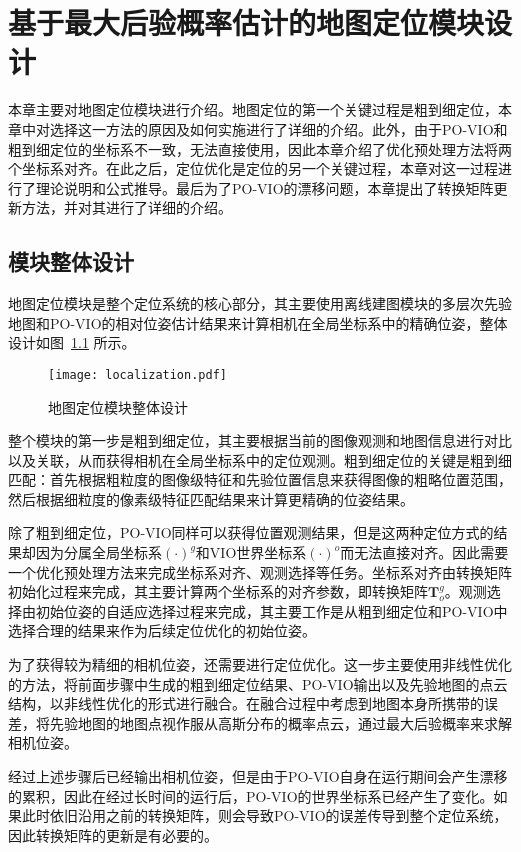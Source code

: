 
\chapter{基于最大后验概率估计的地图定位模块设计}

本章主要对地图定位模块进行介绍。地图定位的第一个关键过程是粗到细定位，本章中对选择这一方法的原因及如何实施进行了详细的介绍。此外，由于PO-VIO和粗到细定位的坐标系不一致，无法直接使用，因此本章介绍了优化预处理方法将两个坐标系对齐。在此之后，定位优化是定位的另一个关键过程，本章对这一过程进行了理论说明和公式推导。最后为了PO-VIO的漂移问题，本章提出了转换矩阵更新方法，并对其进行了详细的介绍。

\section{模块整体设计}

地图定位模块是整个定位系统的核心部分，其主要使用离线建图模块的多层次先验地图和PO-VIO的相对位姿估计结果来计算相机在全局坐标系中的精确位姿，整体设计如图~\ref{fig:localization} 所示。

\begin{figure}
  \centering
  \texttt{[image: localization.pdf]}
  \caption{地图定位模块整体设计}
  \label{fig:localization}
\end{figure}

整个模块的第一步是粗到细定位，其主要根据当前的图像观测和地图信息进行对比以及关联，从而获得相机在全局坐标系中的定位观测。粗到细定位的关键是粗到细匹配：首先根据粗粒度的图像级特征和先验位置信息来获得图像的粗略位置范围，然后根据细粒度的像素级特征匹配结果来计算更精确的位姿结果。

除了粗到细定位，PO-VIO同样可以获得位置观测结果，但是这两种定位方式的结果却因为分属全局坐标系$(\cdot)^{g}$和VIO世界坐标系$(\cdot)^{o}$而无法直接对齐。因此需要一个优化预处理方法来完成坐标系对齐、观测选择等任务。坐标系对齐由转换矩阵初始化过程来完成，其主要计算两个坐标系的对齐参数，即转换矩阵$\symbf{T}_o^{g}$。观测选择由初始位姿的自适应选择过程来完成，其主要工作是从粗到细定位和PO-VIO中选择合理的结果来作为后续定位优化的初始位姿。

为了获得较为精细的相机位姿，还需要进行定位优化。这一步主要使用非线性优化的方法，将前面步骤中生成的粗到细定位结果、PO-VIO输出以及先验地图的点云结构，以非线性优化的形式进行融合。在融合过程中考虑到地图本身所携带的误差，将先验地图的地图点视作服从高斯分布的概率点云，通过最大后验概率来求解相机位姿。

经过上述步骤后已经输出相机位姿，但是由于PO-VIO自身在运行期间会产生漂移的累积，因此在经过长时间的运行后，PO-VIO的世界坐标系已经产生了变化。如果此时依旧沿用之前的转换矩阵，则会导致PO-VIO的误差传导到整个定位系统，因此转换矩阵的更新是有必要的。



